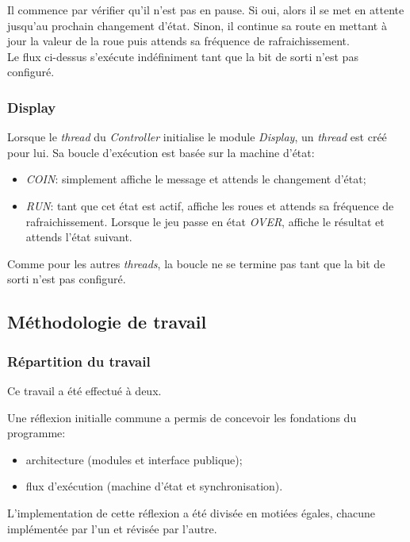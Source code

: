 \documentclass[11pt, a4paper]{article}
\begin{document}
Il commence par vérifier qu'il n'est pas en pause. Si oui, alors il se met en attente jusqu'au prochain changement d'état.
Sinon, il continue sa route en mettant à jour la valeur de la roue puis attends sa fréquence de rafraichissement. \\

Le flux ci-dessus s'exécute indéfiniment tant que la bit de sorti n'est pas configuré.

\subsubsection{Display}
Lorsque  le \textit{thread} du \textit{Controller} initialise le module \textit{Display},
un \textit{thread} est créé pour lui. Sa boucle d'exécution est basée sur la machine d'état:
\begin{itemize}
    \item \textit{COIN}: simplement affiche le message et attends le changement d'état;
    \item \textit{RUN}: tant que cet état est actif, affiche les roues et attends sa fréquence de rafraichissement.
	\subitem Lorsque le jeu passe en état \textit{OVER}, affiche le résultat et attends l'état suivant. \\
\end{itemize}

Comme pour les autres \textit{threads}, la boucle ne se termine pas tant que la bit de sorti n'est pas configuré.

\newpage

\subsection{Méthodologie de travail}
\subsubsection{Répartition du travail}

Ce travail a été effectué à deux.

Une réflexion initialle commune a permis de concevoir les fondations du programme:

\begin{itemize}
    \item architecture (modules et interface publique);
    \item flux d'exécution (machine d'état et synchronisation). \\
\end{itemize}

L'implementation de cette réflexion a été  divisée en motiées égales, chacune implémentée par l'un et révisée par l'autre. \\


\newpage
\end{document}
